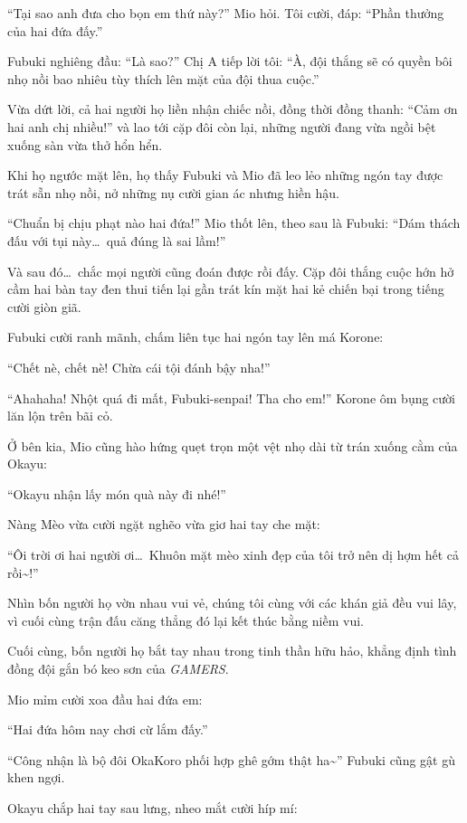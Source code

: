 \documentclass[../main.tex]{subfiles}
\begin{document}
``Tại sao anh đưa cho bọn em thứ này?'' Mio hỏi. Tôi cười, đáp: ``Phần thưởng của hai đứa đấy.''

Fubuki nghiêng đầu: ``Là sao?'' Chị A tiếp lời tôi: ``À, đội thắng sẽ có quyền bôi nhọ nồi bao nhiêu tùy thích lên mặt của đội thua cuộc.''

Vừa dứt lời, cả hai người họ liền nhận chiếc nồi, đồng thời đồng thanh: ``Cảm ơn hai anh chị nhiều!'' và lao tới cặp đôi còn lại, những người đang vừa ngồi bệt xuống sàn vừa thở hổn hển.

Khi họ ngước mặt lên, họ thấy Fubuki và Mio đã leo lẻo những ngón tay được trát sẵn nhọ nồi, nở những nụ cười gian ác nhưng hiền hậu.

``Chuẩn bị chịu phạt nào hai đứa!'' Mio thốt lên, theo sau là Fubuki: ``Dám thách đấu với tụi này\dots\ quả đúng là sai lầm!''

Và sau đó\dots\ chắc mọi người cũng đoán được rồi đấy. Cặp đôi thắng cuộc hớn hở cầm hai bàn tay đen thui tiến lại gần trát kín mặt hai kẻ chiến bại trong tiếng cười giòn giã.

Fubuki cười ranh mãnh, chấm liên tục hai ngón tay lên má Korone:

``Chết nè, chết nè! Chừa cái tội đánh bậy nha!''

``Ahahaha! Nhột quá đi mất, Fubuki-senpai! Tha cho em!'' Korone ôm bụng cười lăn lộn trên bãi cỏ.

Ở bên kia, Mio cũng hào hứng quẹt trọn một vệt nhọ dài từ trán xuống cằm của Okayu:

``Okayu nhận lấy món quà này đi nhé!''

Nàng Mèo vừa cười ngặt nghẽo vừa giơ hai tay che mặt:

``Ôi trời ơi hai người ơi\dots\ Khuôn mặt mèo xinh đẹp của tôi trở nên dị hợm hết cả rồi\~{}!''

Nhìn bốn người họ vờn nhau vui vẻ, chúng tôi cùng với các khán giả đều vui lây, vì cuối cùng trận đấu căng thẳng đó lại kết thúc bằng niềm vui.

Cuối cùng, bốn người họ bắt tay nhau trong tinh thần hữu hảo, khẳng định tình đồng đội gắn bó keo sơn của \textit{GAMERS}.

Mio mỉm cười xoa đầu hai đứa em:

``Hai đứa hôm nay chơi cừ lắm đấy.''

``Công nhận là bộ đôi OkaKoro phối hợp ghê gớm thật ha\~{}'' Fubuki cũng gật gù khen ngợi.

Okayu chắp hai tay sau lưng, nheo mắt cười híp mí:
\end{document}
